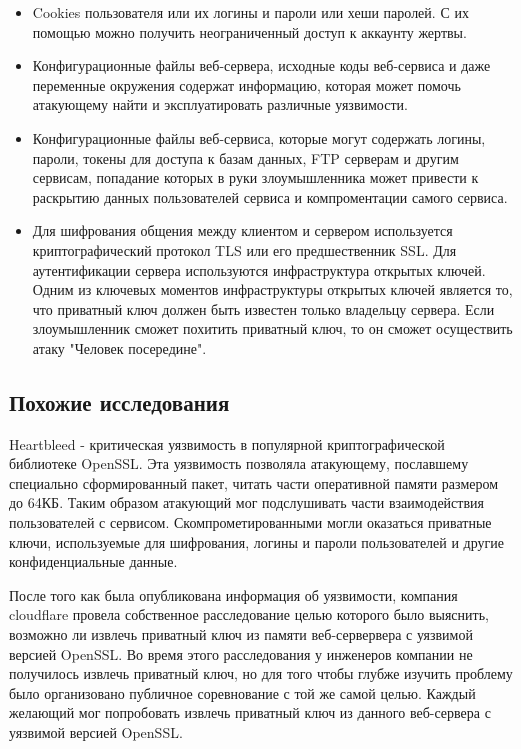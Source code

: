\documentclass[20pt]{article}
\begin{document}
\begin{itemize}

  \item Cookies пользователя или их логины и пароли или хеши паролей. С их
  помощью можно получить неограниченный доступ к аккаунту жертвы.

  \item Конфигурационные файлы веб-сервера, исходные коды веб-сервиса и даже переменные
  окружения содержат информацию, которая может помочь атакующему найти и
  эксплуатировать различные уязвимости.

  \item Конфигурационные файлы веб-сервиса, которые могут содержать логины,
  пароли, токены для доступа к базам данных, FTP серверам и другим сервисам,
  попадание которых в руки злоумышленника может привести к раскрытию данных
  пользователей сервиса и компроментации самого сервиса.

  \item Для шифрования общения между клиентом и сервером используется криптографический
  протокол TLS\cite{tls} или его предшественник SSL. Для аутентификации сервера
  используются инфраструктура открытых ключей\cite{pki}. Одним из ключевых моментов
  инфраструктуры открытых ключей является то, что приватный ключ должен быть
  известен только владельцу сервера. Если злоумышленник сможет похитить приватный
  ключ, то он сможет осуществить атаку "Человек посередине"\cite{mitm}.

\end{itemize}


\subsection{Похожие исследования}

Heartbleed\cite{heartbleed} - критическая уязвимость в популярной криптографической
библиотеке OpenSSL. Эта уязвимость позволяла атакующему, пославшему специально
сформированный пакет, читать части оперативной памяти размером до 64КБ. Таким
образом атакующий мог подслушивать части взаимодействия пользователей с сервисом.
Скомпрометированными могли оказаться приватные ключи, используемые для шифрования,
логины и пароли пользователей и другие конфиденциальные данные.

После того как была опубликована информация об уязвимости, компания cloudflare
провела собственное расследование\cite{heartbleed/investigation} целью которого
было выяснить, возможно ли извлечь приватный ключ из памяти веб-сервервера с
уязвимой версией OpenSSL. Во время этого расследования у инженеров компании не
получилось извлечь приватный ключ, но для того чтобы глубже изучить проблему
было организовано публичное соревнование\cite{hearbleed/investigation} с той же
самой целью. Каждый желающий мог попробовать извлечь приватный ключ из
данного веб-сервера с уязвимой версией OpenSSL.
\end{document}
